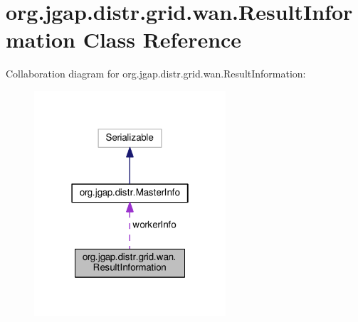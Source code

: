 \hypertarget{classorg_1_1jgap_1_1distr_1_1grid_1_1wan_1_1_result_information}{\section{org.\-jgap.\-distr.\-grid.\-wan.\-Result\-Information Class Reference}
\label{classorg_1_1jgap_1_1distr_1_1grid_1_1wan_1_1_result_information}
}


Collaboration diagram for org.\-jgap.\-distr.\-grid.\-wan.\-Result\-Information\-:
\nopagebreak
\begin{figure}[H]
\begin{center}
\leavevmode
\includegraphics[width=202pt]{classorg_1_1jgap_1_1distr_1_1grid_1_1wan_1_1_result_information__coll__graph}
\end{center}
\end{figure}
